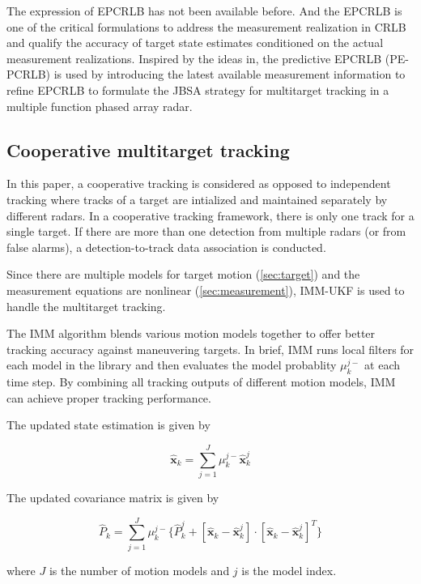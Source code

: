 \documentclass[12pt,journal,draftclsnofoot,onecolumn]{IEEEtran}
\begin{document}
The expression of EPCRLB has not been available before. And the EPCRLB is one of the critical formulations to address the measurement realization in CRLB and qualify the accuracy of target state estimates conditioned on the actual measurement realizations. Inspired by the ideas in\cite{song2010target}, the predictive EPCRLB (PE-PCRLB) is used by introducing the latest available measurement information to refine EPCRLB to formulate the {JBSA}  strategy for multitarget tracking in a multiple function phased array radar. 

\subsection{Cooperative multitarget tracking}
In this paper, a cooperative tracking is considered as opposed to independent tracking where tracks of a target are intialized and maintained separately by different radars. In a cooperative tracking framework, there is only one track for a single target. If there are more than one detection from multiple radars (or from false alarms), a detection-to-track data association is conducted\cite{moo2015coordinated}.

Since there are multiple models for target motion (\ref{sec:target}) and the measurement equations are nonlinear (\ref{sec:measurement}), IMM-UKF is used to handle the multitarget tracking. 

The IMM algorithm blends various motion models together to offer better tracking accuracy against maneuvering targets. In brief, IMM runs local filters for each model in the library and then evaluates the model probablity $\mu_{k}^{j-}$ at each time step. By combining all tracking outputs of different motion models, IMM can achieve proper tracking performance.

The updated state estimation is given by

\begin{equation}
	\hat{\mathbf{x}}_k = \sum_{j=1}^{J} \mu_{k}^{j-}\hat{\mathbf{x}}_k^{j}
\end{equation}

The updated covariance matrix is given by

\begin{equation}
	\hat{P}_k = \sum_{j=1}^{J} \mu_{k}^{j-}\{ \hat{P}_k^j +[\hat{\mathbf{x}}_k-\hat{\mathbf{x}}_k^{j}]\cdot[\hat{\mathbf{x}}_k-\hat{\mathbf{x}}_k^{j}]^T
	\}
\end{equation}

where $J$ is the number of motion models and $j$ is the model index.
\end{document}
